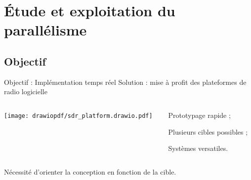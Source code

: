 \documentclass[../main.tex]{subfiles}
\begin{document}
\section{Étude et exploitation du parallélisme}

\subsection{Objectif}

\begin{frame}{Objectif : Implémentation temps réel}
  {Solution : mise à profit des plateformes de radio logicielle}
  \begin{columns}
    \begin{column}{.55\linewidth}
      \centering
      \texttt{[image: drawiopdf/sdr\_platform.drawio.pdf]}
    \end{column}
    \begin{column}{.35\linewidth}
      \begin{ctrlitemize}{1 em}
        \item Prototypage rapide ;
        \item Plusieurs cibles possibles ;
        \item Systèmes versatiles.
      \end{ctrlitemize}
    \end{column}
  \end{columns}

  \vspace{1 em}

  \begin{center}
    Nécessité d'orienter la conception en fonction de la cible.
  \end{center}
\end{frame}
\end{document}
